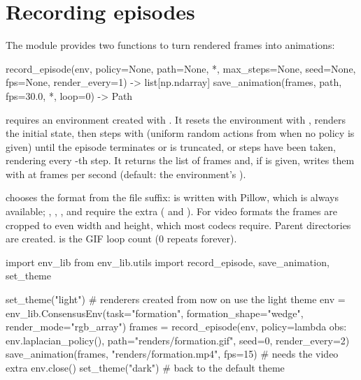 \section{Recording episodes}\label{sec:examples-recording}

The module  provides two functions to turn rendered
frames into animations:

\begin{pycode}
record_episode(env, policy=None, path=None, *, max_steps=None, seed=None,
               fps=None, render_every=1) -> list[np.ndarray]
save_animation(frames, path, fps=30.0, *, loop=0) -> Path
\end{pycode}

 requires an environment created with
. It resets the environment with ,
renders the initial state, then steps with  (uniform
random actions from  when no policy is given) until the
episode terminates or is truncated, or  steps have been
taken, rendering every -th step. It returns the list of
  frames and, if  is given, writes them
with  at  frames per second (default: the
environment's ).

 chooses the format from the file suffix:  is
written with Pillow, which is always available; , ,
,  and  require the  extra
( and ). For video formats the frames are
cropped to even width and height, which most codecs require. Parent
directories are created.  is the GIF loop count (0 repeats
forever).

\begin{pycode}
import env_lib
from env_lib.utils import record_episode, save_animation, set_theme

set_theme("light")          # renderers created from now on use the light theme
env = env_lib.ConsensusEnv(task="formation", formation_shape="wedge",
                           render_mode="rgb_array")
frames = record_episode(env, policy=lambda obs: env.laplacian_policy(),
                        path="renders/formation.gif", seed=0, render_every=2)
save_animation(frames, "renders/formation.mp4", fps=15)   # needs the video extra
env.close()
set_theme("dark")                   # back to the default theme
\end{pycode}

